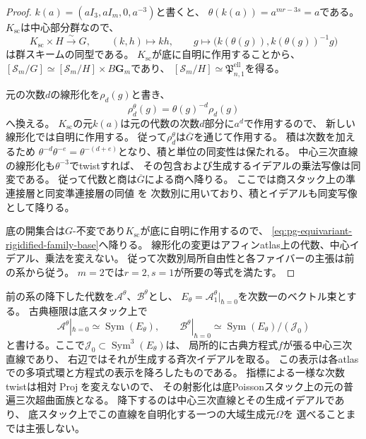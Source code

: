 \begin{proof}
$k(a)=(aI_3,aI_m,0,a^{-3})$と書くと、
$\theta(k(a))=a^{mr-3s}=a$である。
$K_{\mathrm{sc}}$は中心部分群なので、
\begin{equation}
 K_{\mathrm{sc}}\times H\xrightarrow{\ \sim\ }G,
 \qquad (k,h)\longmapsto kh,
 \qquad
 g\longmapsto
 \bigl(k(\theta(g)),k(\theta(g))^{-1}g\bigr)
 \label{eq:pg-equivariant-character-splitting}
\end{equation}
は群スキームの同型である。
$K_{\mathrm{sc}}$が底に自明に作用することから、
$[\mathscr S_m/G]\simeq[\mathscr S_m/H]\times B\mathbf G_m$であり、
$[\mathscr S_m/H]\simeq\mathfrak P_{n,1}^{\mathrm{ell}}$を得る。

元の次数$d$の線形化を$\rho_d(g)$と書き、
\begin{equation}
 \rho_d^{\theta}(g)=\theta(g)^{-d}\rho_d(g)
 \label{eq:pg-equivariant-character-twist}
\end{equation}
へ換える。
$K_{\mathrm{sc}}$の元$k(a)$は元の代数の次数$d$部分に$a^d$で作用するので、
新しい線形化では自明に作用する。
従って$\rho_d^{\theta}$は$\overline G$を通じて作用する。
積は次数を加えるため
$\theta^{-d}\theta^{-e}=\theta^{-(d+e)}$となり、積と単位の同変性は保たれる。
中心三次直線の線形化も$\theta^{-3}$でtwistすれば、
その包含および生成するイデアルの乗法写像は同変である。
従って代数と商は$\overline G$による商へ降りる。
ここでは商スタック上の準連接層と同変準連接層の同値
\cite[Proposition~96.14.3, Tag~\texttt{06WT}]{PStacks}を
次数別に用いており、積とイデアルも同変写像として降りる。

底の開集合は$G$-不変であり$K_{\mathrm{sc}}$が底に自明に作用するので、
\eqref{eq:pg-equivariant-rigidified-family-base}へ降りる。
線形化の変更はアフィンatlas上の代数、中心イデアル、乗法を変えない。
従って次数別局所自由性と各ファイバーの主張は前の系から従う。
$m=2$では$r=2,s=1$が所要の等式を満たす。
\end{proof}

\begin{remark}[降下した古典極限と中心三次直線]
\label{rem:pg-equivariant-classical-family}
前の系の降下した代数を$\mathcal A^\theta$、$\mathcal B^\theta$とし、
$E_\theta=\mathcal A^\theta_1|_{\hbar=0}$を次数一のベクトル束とする。
古典極限は底スタック上で
\begin{equation}
 \mathcal A^\theta|_{\hbar=0}\simeq\operatorname{Sym}(E_\theta),
 \qquad
 \mathcal B^\theta|_{\hbar=0}
 \simeq\operatorname{Sym}(E_\theta)/(\mathcal J_0)
 \label{eq:pg-equivariant-classical-family}
\end{equation}
と書ける。ここで$\mathcal J_0\subset\operatorname{Sym}^3(E_\theta)$は、
局所的に古典方程式$f$が張る中心三次直線であり、
右辺ではそれが生成する斉次イデアルを取る。
この表示は各atlasでの多項式環と方程式の表示を降ろしたものである。
指標による一様な次数twistは相対$\operatorname{Proj}$を変えないので、
その射影化は底Poissonスタック上の元の普遍三次超曲面族となる。
降下するのは中心三次直線とその生成イデアルであり、
底スタック上でこの直線を自明化する一つの大域生成元$\Omega$を
選べることまでは主張しない。
\end{remark}

